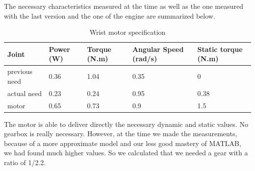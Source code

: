 \bigbreak
The necessary characteristics measured at the time as well as the one measured with the last version and the one of the engine are summarized below.
\begin{table}[ht]
    \centering
    \begin{tabular}{|p{1.5cm} | p{2cm} | p{2.5cm}| p{2.7cm} | p{2.7cm} |} 
        \hline
        \textbf{Joint}& \textbf{Power (W)} & \textbf{Torque (N.m)} & \textbf{Angular Speed (rad/s)} & \textbf{Static torque (N.m)}\\ [0.3ex]
        \hline
        previous need & 0.36 & 1.04 & 0.35 & 0 \\ 
        \hline
        actual need & 0.23 & 0.24 & 0.95 & 0.38 \\ 
        \hline
        motor & 0.65 & 0.73 & 0.9 & 1.5\\ 
        \hline
    \end{tabular}
    \caption{Wrist motor specification}
\end{table}
\FloatBarrier
The motor is able to deliver directly the necessary dynamic and static values. No gearbox is really necessary. However, at the time we made the measurements, because of a more approximate model and our less good mastery of MATLAB, we had found much higher values. So we calculated that we needed a gear with a ratio of 1/2.2.